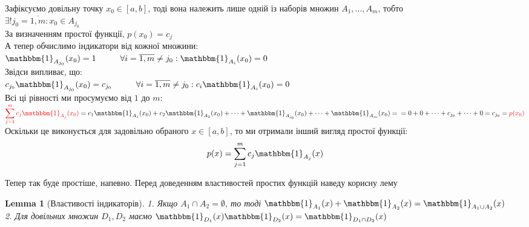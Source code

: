 \documentclass[a4paper, 14pt]{extarticle}
\def\huge{\displaystyle}
\theoremstyle{theoremdd}
\theoremstyle{theoremdd}
\theoremstyle{theoremdd}
\theoremstyle{theoremdd}
\theoremstyle{theoremdd}
\theoremstyle{theoremdd}
\theoremstyle{theoremdd}
\newtheorem{lemma}[theorem]{Lemma}
\theoremstyle{theoremdd}
\begin{document}
Зафіксуємо довільну точку $x_0 \in [a,b]$, тоді вона належить лише одній із наборів множин $A_1,\dots,A_m$, тобто\\
$\exists! j_0 = \overline{1,m}: x_0 \in A_{j_0}$\\
За визначенням простої функції, $p(x_0) = c_j$\\
А тепер обчислимо індикатори від кожної множини:\\
$\mathbbm{1}_{A_{j_0}}(x_0) = 1 \hspace{1cm} \forall i = \overline{1,m} \neq j_0: \mathbbm{1}_{A_{i}}(x_0) = 0$\\
Звідси випливає, що:\\
$c_{j_0} \mathbbm{1}_{A_{j_0}}(x_0) = c_{j_0} \hspace{1cm} \forall i = \overline{1,m} \neq j_0: c_i \mathbbm{1}_{A_{i}}(x_0) = 0$\\
Всі ці рівності ми просумуємо від $1$ до $m$:\\
$\huge \textcolor{red}{\sum_{j=1}^m c_j \mathbbm{1}_{A_{j}}(x_0)} = c_1 \mathbbm{1}_{A_{1}}(x_0) + c_2 \mathbbm{1}_{A_{2}}(x_0) + \dots + \mathbbm{1}_{A_{j_0}}(x_0) + \dots + \mathbbm{1}_{A_{m}}(x_0) = \\ = 0 + 0 + \dots + c_{j_0} + \dots + 0 = c_{j_0} = \textcolor{red}{p(x_0)}$\\
Оскільки це виконується для задовільно обраного $x \in [a,b]$, то ми отримали інший вигляд простої функції:
\begin{align*}
p(x) = \sum_{j=1}^m c_j \mathbbm{1}_{A_j}(x)
\end{align*}

Тепер так буде простіше, напевно. Перед доведенням властивостей простих функцій наведу корисну лему
\begin{lemma}[Властивості індикаторів]
1. Якщо $A_1 \cap A_2 = \emptyset$, то тоді $\mathbbm{1}_{A_1}(x) + \mathbbm{1}_{A_2}(x) = \mathbbm{1}_{A_1 \cup A_2}(x)$\\
2. Для довільних множин $D_1, D_2$ маємо $\mathbbm{1}_{D_1}(x) \mathbbm{1}_{D_2}(x) = \mathbbm{1}_{D_1 \cap D_2}(x)$
\end{lemma}
\end{document}
